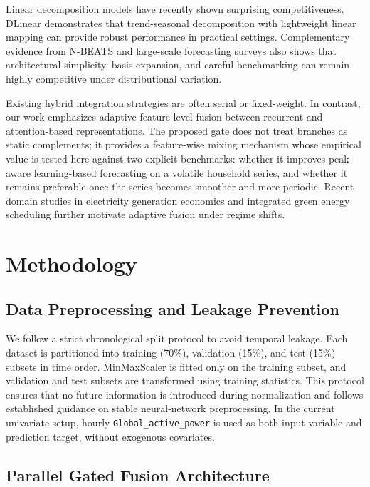 \documentclass[pdflatex,sn-mathphys-num]{sn-jnl}
\theoremstyle{thmstyleone}
\theoremstyle{thmstyletwo}
\theoremstyle{thmstylethree}
\begin{document}
Linear decomposition models have recently shown surprising competitiveness. DLinear \cite{zeng2023transformers} demonstrates that trend-seasonal decomposition with lightweight linear mapping can provide robust performance in practical settings. Complementary evidence from N-BEATS and large-scale forecasting surveys also shows that architectural simplicity, basis expansion, and careful benchmarking can remain highly competitive under distributional variation.\cite{oreshkin2019nbeats,benidis2021deeplearning}

Existing hybrid integration strategies are often serial or fixed-weight. In contrast, our work emphasizes adaptive feature-level fusion between recurrent and attention-based representations. The proposed gate does not treat branches as static complements; it provides a feature-wise mixing mechanism whose empirical value is tested here against two explicit benchmarks: whether it improves peak-aware learning-based forecasting on a volatile household series, and whether it remains preferable once the series becomes smoother and more periodic. Recent domain studies in electricity generation economics and integrated green energy scheduling further motivate adaptive fusion under regime shifts.\cite{an2022economic,bian2025lstm}

\section{Methodology}

\subsection{Data Preprocessing and Leakage Prevention}

We follow a strict chronological split protocol to avoid temporal leakage. Each dataset is partitioned into training (70\%), validation (15\%), and test (15\%) subsets in time order. MinMaxScaler is fitted only on the training subset, and validation and test subsets are transformed using training statistics. This protocol ensures that no future information is introduced during normalization and follows established guidance on stable neural-network preprocessing.\cite{sola1997importance} In the current univariate setup, hourly \texttt{Global\_active\_power} is used as both input variable and prediction target, without exogenous covariates.

\subsection{Parallel Gated Fusion Architecture}
\end{document}
